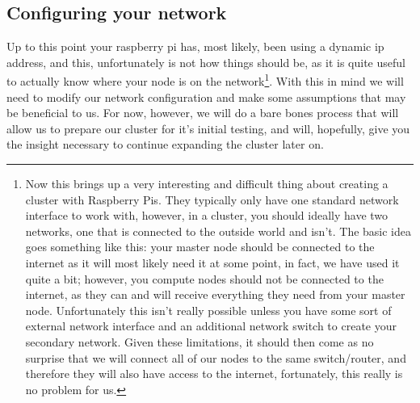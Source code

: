 \documentclass[]{article}
\begin{document}
\subsection{Configuring your network}
Up to this point your raspberry pi has, most likely, been using a dynamic ip address, and this, unfortunately is not how things should
be, as it is quite useful to actually know where your node is on the network\footnote{Now this brings up a very interesting and 
    difficult thing about creating a cluster with Raspberry Pis. They typically only have one standard network interface to work with, 
              however, in a cluster, you should ideally have two networks, one that is connected to the outside world and isn't. The basic idea goes
                  something like this: your master node should be connected to the internet as it will most likely need it at some point, in fact, we
                  have used it quite a bit; however, you compute nodes should not be connected to the internet, as they can and will receive everything 
                  they need from your master node. Unfortunately this isn't really possible unless you have some sort of external network interface and
                  an additional network switch to create your secondary network. Given these limitations, it should then come as no surprise that we
                  will connect all of our nodes to the same switch/router, and therefore they will also have access to the internet, fortunately, this
                  really is no problem for us.}. With this in mind we will need to modify our network configuration and make some assumptions that may
                  be beneficial to us. For now, however, we will do a bare bones process that will allow us to prepare our cluster for it's initial
                  testing, and will, hopefully, give you the insight necessary to continue expanding the cluster later on.
\end{document}
